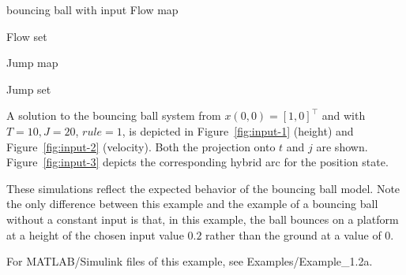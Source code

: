 \begin{example}{bouncing ball with input}
Flow map
\label{scr:f}

Flow set
\label{scr:C}

Jump map
\label{scr:g}

Jump set
\label{scr:D}

A solution to the bouncing ball system from $x(0,0)=[1,0]^\top$ and with $T=10, J=20$, $rule =1$, is
depicted in Figure~\ref{fig:input-1} (height) and Figure~\ref{fig:input-2} (velocity).  Both the projection
onto $t$ and $j$ are shown. Figure~\ref{fig:input-3} depicts the corresponding hybrid arc for the position state.

These simulations reflect the expected behavior of the bouncing ball model. Note the only
difference between this example and the example of a bouncing ball without a constant input is that, in this example, the ball bounces on a platform at a height of the chosen input value $0.2$ rather than the ground at a value of $0$.

For MATLAB/Simulink files of this example, see Examples/Example\_1.2a.

\end{example}
